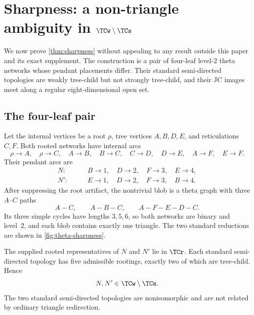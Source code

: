 \section{Sharpness: a non-triangle ambiguity in \texorpdfstring{$\TCw\setminus\TCs$}{W-TC minus S-TC}}\label{sec:sharpness}

We now prove \cref{thm:sharpness} without appealing to any result outside this paper and its exact supplement.  The construction is a pair of four-leaf level-2 theta networks whose pendant placements differ.  Their standard semi-directed topologies are weakly tree-child but not strongly tree-child, and their JC images meet along a regular eight-dimensional open set.

\subsection{The four-leaf pair}

Let the internal vertices be a root $\rho$, tree vertices $A,B,D,E$, and reticulations $C,F$.  Both rooted networks have internal arcs
\begin{equation}\label{eq:theta-common-arcs}
\rho\to A,\quad \rho\to C,\quad A\to B,\quad B\to C,
\quad C\to D,\quad D\to E,\quad A\to F,\quad E\to F.
\end{equation}
Their pendant arcs are
\begin{align}
N:&\qquad B\to1,\quad D\to2,\quad F\to3,\quad E\to4,\label{eq:theta-N-pendants}\\
N':&\qquad E\to1,\quad D\to2,\quad F\to3,\quad B\to4.\label{eq:theta-Np-pendants}
\end{align}
After suppressing the root artifact, the nontrivial blob is a theta graph with three $A$--$C$ paths
\[
A-C,\qquad A-B-C,\qquad A-F-E-D-C.
\]
Its three simple cycles have lengths $3,5,6$, so both networks are binary and level~2, and each blob contains exactly one triangle.  The two standard reductions are shown in \cref{fig:theta-sharpness}.



\begin{proposition}\label{prop:theta-class}
The supplied rooted representatives of $N$ and $N'$ lie in $\TCr$.  Each standard semi-directed topology has five admissible rootings, exactly two of which are tree-child.  Hence
\[
N,N'\in\TCw\setminus\TCs.
\]
The two standard semi-directed topologies are nonisomorphic and are not related by ordinary triangle redirection.
\end{proposition}

